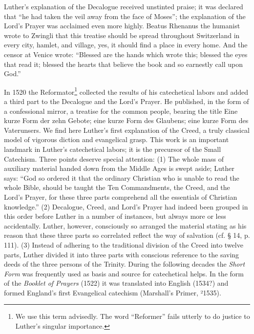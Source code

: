 Luther’s explanation of the Decalogue received unstinted praise; it was declared that “he had taken the veil away from the face of Moses”; the explanation of the Lord’s Prayer was acclaimed even more highly. Beatus Rhenanus the humanist wrote to Zwingli that this treatise should be spread throughout Switzerland in every city, hamlet, and village, yes, it should find a place in every home. And the censor at Venice wrote: “Blessed are the hands which wrote this; blessed the eyes that read it; blessed the hearts that believe the book and so earnestly call upon God.”

In 1520 the Reformator\footnote{We use this term advisedly. The word “Reformer” fails utterly to do justice to Luther’s singular importance.} collected the results of his catechetical labors and added a third part to the Decalogue and the Lord’s Prayer. He published, in the form of a confessional mirror, a treatise for the common people, bearing the title Eine kurze Form der zehn Gebote; eine kurze Form des Glaubens; eine kurze Form des Vaterunsers. We find here
Luther’s first explanation of the Creed, a truly classical model of vigorous diction and evangelical grasp. This work is an important landmark in Luther’s catechetical labors; it is the precursor of the Small Catechism. Three points deserve special attention: (1) The whole mass of auxiliary material handed down from the Middle Ages is swept aside; Luther says: “God so ordered it that the ordinary Christian who is unable to read the whole Bible, should be taught the Ten Commandments, the Creed, and the Lord’s Prayer, for these three parts comprehend all the essentials of Christian knowledge.” (2) Decalogue, Creed, and Lord’s Prayer had indeed been grouped in this order before Luther in a number of instances, but always more or less accidentally. Luther, however, consciously so arranged the material stating as his reason that these three parts so correlated reflect the way of salvation (cf. § 14, p. 111). (3) Instead of adhering to the traditional division of the Creed into twelve parts, Luther divided it into three parts with conscious reference to the saving deeds of the three persons of the Trinity. During the following decades the \emph{Short Form} was frequently used as basis and source for catechetical helps. In the form of the \emph{Booklet of Prayers} (1522) it was translated into English (1534?) and formed England’s first Evangelical catechism (Marshall’s Primer, ²1535).

